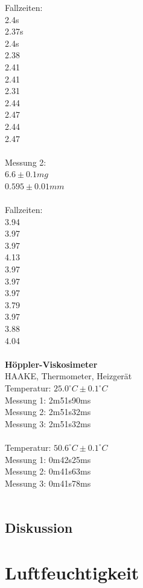 \documentclass[12pt,a4paper]{article}
\begin{document}
\begin{multicols}{2}
Fallzeiten:\\
2.4s\\
2.37s\\
2.4s\\
2.38\\
2.41\\
2.41\\
2.31\\
2.44\\
2.47\\
2.44\\
2.47\\
\\
Messung 2:\\
$6.6 \pm 0.1mg$\\
$0.595 \pm 0.01mm$\\
\\
Fallzeiten:\\
3.94\\
3.97\\
3.97\\
4.13\\
3.97\\
3.97\\
3.97\\
3.79\\
3.97\\
3.88\\
4.04\\
\\
\textbf{Höppler-Viskosimeter}\\
HAAKE, Thermometer, Heizgerät\\
Temperatur: $25.0^{\circ}C \pm 0.1^{\circ}C$\\
Messung 1: 2m51s90ms\\
Messung 2: 2m51s32ms\\
Messung 3: 2m51s32ms\\
\\
Temperatur: $50.6^{\circ}C \pm 0.1^{\circ}C$\\
Messung 1: 0m42s25ms\\
Messung 2: 0m41s63ms\\
Messung 3: 0m41s78ms\\
\\
\subsection{Diskussion}


\section{Luftfeuchtigkeit}

\end{multicols}
\end{document}
